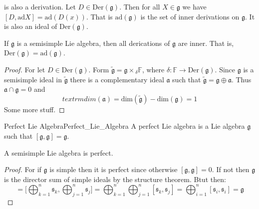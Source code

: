 \documentclass[crop=false,class=article]{standalone}                           %
\begin{document}
        is also a derivation. Let $D\in\textrm{Der}(\mathfrak{g})$. Then for all
        $X\in\mathfrak{g}$ we have $[D,\textrm{ad}X]=\textrm{ad}(D(x))$. That is
        $\textrm{ad}(\mathfrak{g})$ is the set of inner derivations on
        $\mathfrak{g}$. It is also an ideal of $\textrm{Der}(\mathfrak{g})$.
        \begin{theorem}
            If $\mathfrak{g}$ is a semisimple Lie algebra, then all derications
            of $\mathfrak{g}$ are inner. That is,
            $\textrm{Der}(\mathfrak{g})=\textrm{ad}(\mathfrak{g})$.
        \end{theorem}
        \begin{proof}
            For let $D\in\textrm{Der}(\mathfrak{g})$. Form
            $\tilde{\mathfrak{g}}=\mathfrak{g}\times{_{\delta}\mathbb{F}}$,
            where $\delta:\mathbb{F}\rightarrow\textrm{Der}(\mathfrak{g})$.
            Since $\mathfrak{g}$ is a semisimple ideal in $\tilde{\mathfrak{g}}$
            there is a complementary ideal $\mathfrak{a}$ such that
            $\tilde{\mathfrak{g}}=\mathfrak{g}\oplus\mathfrak{a}$. Thus
            $\mathfrak{a}\cap\mathfrak{g}=0$ and
            \begin{equation}
                textrm{dim}(\mathfrak{a})
                =\textrm{dim}(\tilde{\mathfrak{g}})-\textrm{dim}(\mathfrak{g})
                =1
            \end{equation}
            Some more stuff.
        \end{proof}
        \begin{fdefinition}{Perfect Lie Algebra}{Perfect_Lie_Algebra}
            A perfect Lie algebra is a Lie algebra $\mathfrak{g}$ such that
            $[\mathfrak{g},\mathfrak{g}]=\mathfrak{g}$.
        \end{fdefinition}
        \begin{theorem}
            A semisimple Lie algebra is perfect.
        \end{theorem}
        \begin{proof}
            For if $\mathfrak{g}$ is simple then it is perfect since otherwise
            $[\mathfrak{g},\mathfrak{g}]=0$. If not then $\mathfrak{g}$ is the
            director sum of simple ideals by the structure theorem. Btut then:
            \begin{equation}
                [\mathfrak{g},\mathfrak{g}]
                =\Big[\bigoplus_{k=1}^{n}\mathfrak{s}_{k},
                      \bigoplus_{j=1}^{n}\mathfrak{s}_{j}\Big]
                =\bigoplus_{k=1}^{n}\bigoplus_{j=1}^{n}
                    [\mathfrak{s}_{k},\mathfrak{s}_{j}]
                =\bigoplus_{i=1}^{n}[\mathfrak{s}_{i},\mathfrak{s}_{i}]
                =\mathfrak{g}
            \end{equation}
        \end{proof}
\end{document}
